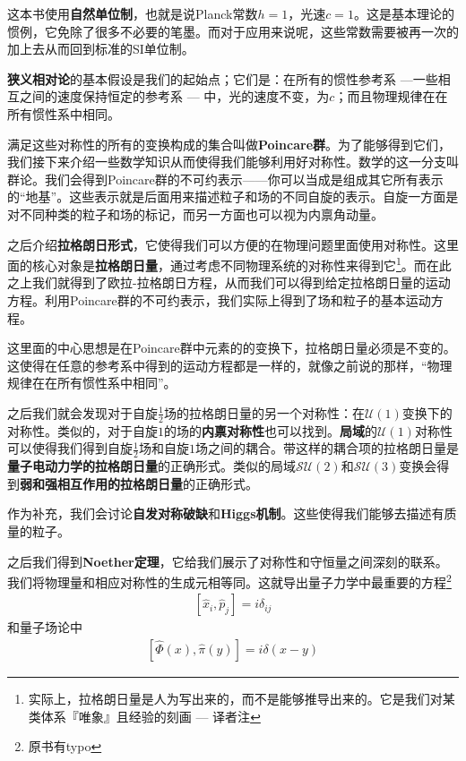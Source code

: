 这本书使用{\bf 自然单位制}，也就是说Planck常数$h = 1$，光速$c=1$。这是基本理论的惯例，它免除了很多不必要的笔墨。而对于应用来说呢，这些常数需要被再一次的加上去从而回到标准的SI单位制。

{\bf 狭义相对论}的基本假设是我们的起始点；它们是：在所有的惯性参考系 ---一些相互之间的速度保持恒定的参考系 --- 中，光的速度不变，为$c$；而且物理规律在在所有惯性系中相同。

满足这些对称性的所有的变换构成的集合叫做{\bf Poincare群}。为了能够得到它们，我们接下来介绍一些数学知识从而使得我们能够利用好对称性。数学的这一分支叫群论。我们会得到Poincare群的不可约表示——你可以当成是组成其它所有表示的“地基”。这些表示就是后面用来描述粒子和场的不同自旋的表示。自旋一方面是对不同种类的粒子和场的标记，而另一方面也可以视为内禀角动量。

之后介绍{\bf 拉格朗日形式}，它使得我们可以方便的在物理问题里面使用对称性。这里面的核心对象是{\bf 拉格朗日量}，通过考虑不同物理系统的对称性来得到它\footnote{实际上，拉格朗日量是人为写出来的，而不是能够推导出来的。它是我们对某类体系『唯象』且经验的刻画 --- 译者注}。而在此之上我们就得到了欧拉-拉格朗日方程，从而我们可以得到给定拉格朗日量的运动方程。利用Poincare群的不可约表示，我们实际上得到了场和粒子的基本运动方程。

这里面的中心思想是在Poincare群中元素的的变换下，拉格朗日量必须是不变的。这使得在任意的参考系中得到的运动方程都是一样的，就像之前说的那样，“物理规律在在所有惯性系中相同”。

之后我们就会发现对于自旋$\tfrac{1}{2}$场的拉格朗日量的另一个对称性：在$\mathcal{U}(1)$变换下的对称性。类似的，对于自旋$1$的场的{\bf 内禀对称性}也可以找到。{\bf 局域}的$\mathcal{U}(1)$对称性可以使得我们得到自旋$\tfrac{1}{2}$场和自旋$1$场之间的耦合。带这样的耦合项的拉格朗日量是{\bf 量子电动力学的拉格朗日量}的正确形式。类似的局域$\mathcal{SU}(2)$和$\mathcal{SU}(3)$变换会得到{\bf 弱和强相互作用的拉格朗日量}的正确形式。

作为补充，我们会讨论{\bf 自发对称破缺}和{\bf Higgs机制}。这些使得我们能够去描述有质量的粒子。

之后我们得到{\bf Noether定理}，它给我们展示了对称性和守恒量之间深刻的联系。我们将物理量和相应对称性的生成元相等同。这就导出量子力学中最重要的方程\footnote{原书有typo}
\begin{align}\label{eq1.1}
[\hat{x}_i,\hat{p}_j]=i\delta_{ij}
\end{align}
和量子场论中
\begin{align}\label{eq1.2}
[\hat{\Phi}(x),\hat{\pi}(y)]=i\delta(x-y)
\end{align}

